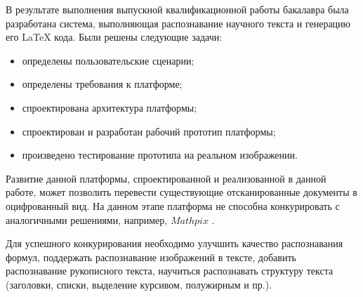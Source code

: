 \conclusion

В результате выполнения выпускной квалификационной работы бакалавра была разработана система, выполняющая распознавание научного текста и генерацию его \LaTeX\; кода. Были решены следующие задачи:
\begin{itemize}
    \item определены пользовательские сценарии;
    \item определены требования к платформе;
    \item спроектирована архитектура платформы;
    \item спроектирован и разработан рабочий прототип платформы;
    \item произведено тестирование прототипа на реальном изображении.
\end{itemize}

Развитие данной платформы, спроектированной и реализованной в данной работе, может позволить перевести существующие отсканированные документы в оцифрованный вид. На данном этапе платформа не способна конкурировать с аналогичными решениями, например, $Mathpix$ \cite{mathpix}.

Для успешного конкурирования необходимо улучшить качество распознавания формул, поддержать распознавание изображений в тексте, добавить распознавание рукописного текста, научиться распознавать структуру текста (заголовки, списки, выделение курсивом, полужирным и пр.).